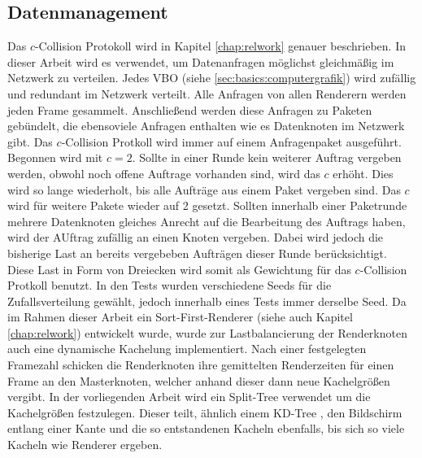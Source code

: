 \subsection{Datenmanagement}
Das $c$-Collision Protokoll wird in Kapitel \ref{chap:relwork} genauer beschrieben. In dieser Arbeit wird es verwendet, um Datenanfragen möglichst gleichmäßig im Netzwerk zu verteilen. Jedes VBO (siehe \ref{sec:basics:computergrafik}) wird zufällig und redundant im Netzwerk verteilt. Alle Anfragen von allen Renderern werden jeden Frame gesammelt. Anschließend werden diese Anfragen zu Paketen gebündelt, die ebensoviele Anfragen enthalten wie es Datenknoten im Netzwerk gibt. Das $c$-Collision Protkoll wird immer auf einem Anfragenpaket ausgeführt. Begonnen wird  mit $c = 2$. Sollte in einer Runde kein weiterer Auftrag vergeben werden, obwohl noch offene Auftrage vorhanden sind, wird das $c$ erhöht. Dies wird so lange wiederholt, bis alle Aufträge aus einem Paket vergeben sind. Das $c$ wird für weitere Pakete wieder auf 2 gesetzt. Sollten innerhalb einer Paketrunde mehrere Datenknoten gleiches Anrecht auf die Bearbeitung des Auftrags haben, wird der AUftrag zufällig an einen Knoten vergeben. Dabei wird jedoch die bisherige Last an bereits vergebeben Aufträgen dieser Runde berücksichtigt. Diese Last in Form von Dreiecken wird somit als Gewichtung für das $c$-Collision Protkoll benutzt. In den Tests wurden verschiedene Seeds für die Zufallsverteilung gewählt, jedoch innerhalb eines Tests immer derselbe Seed.
Da im Rahmen dieser Arbeit ein Sort-First-Renderer (siehe auch Kapitel \ref{chap:relwork}) entwickelt wurde, wurde zur Lastbalancierung der Renderknoten auch eine dynamische Kachelung implementiert. Nach einer festgelegten Framezahl schicken die Renderknoten ihre gemittelten Renderzeiten für einen Frame an den Masterknoten, welcher anhand dieser dann neue Kachelgrößen vergibt. In der vorliegenden Arbeit wird ein Split-Tree verwendet um die Kachelgrößen festzulegen. Dieser teilt, ähnlich einem KD-Tree \cite{RTR3}, den Bildschirm entlang einer Kante und die so entstandenen Kacheln ebenfalls, bis sich so viele Kacheln wie Renderer ergeben. 

